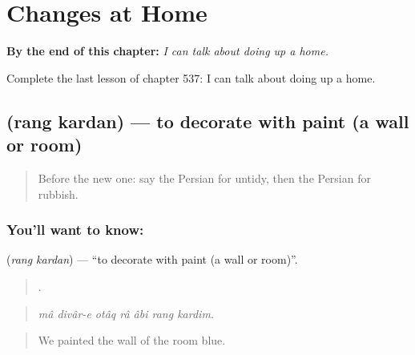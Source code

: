 
\chapter{Changes at Home}
\label{ch:fa-changes-at-home}

\begin{chapteropening}
\textbf{By the end of this chapter:} \emph{I can talk about doing up a home.}

Complete the last lesson of chapter 537: I can talk about doing up a home.
\end{chapteropening}

\section[\texorpdfstring{\fa{رنگ} \fa{کردن} (rang kardan)}{رنگ کردن (rang kardan)}]{  (rang kardan) — to decorate with paint (a wall or room)}

\label{lesson:FA-C537-rang-kardan}



\begin{quote}
Before the new one: say the Persian for untidy, then the Persian for rubbish.
\end{quote}

\subsection*{You'll want to know:  }
\textbf{ } (\emph{rang kardan}) — \textquotedblleft{}to decorate with paint (a wall or room)\textquotedblright{}.

\begin{quote}
      .
\end{quote}

\begin{quote}
\emph{mâ divâr-e otâq râ âbi rang kardim.}
\end{quote}

\begin{quote}
We painted the wall of the room blue.
\end{quote}

